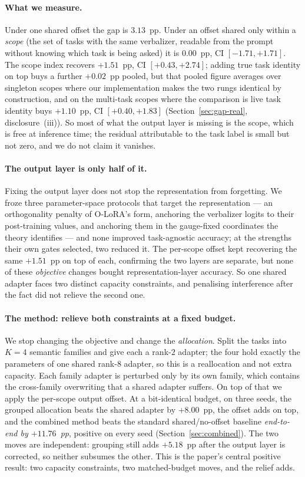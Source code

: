\paragraph{What we measure.}
Under one shared offset the gap is $3.13$~pp. Under an offset shared only within a
\emph{scope} (the set of tasks with the same verbalizer, readable from the prompt
without knowing which task is being asked) it is $0.00$~pp, CI $[-1.71,+1.71]$.
The scope index recovers $+1.51$~pp, CI $[+0.43,+2.74]$; adding true task identity
on top buys a further $+0.02$~pp pooled, but that pooled figure averages over
singleton scopes where our implementation makes the two rungs identical by
construction, and on the multi-task scopes where the comparison is live task
identity buys $+1.10$~pp, CI $[+0.40,+1.83]$
(Section~\ref{sec:gap-real}, disclosure~(iii)). So most of what the output layer is
missing is the scope, which is free at inference time; the residual attributable to
the task label is small but not zero, and we do not claim it vanishes.

\paragraph{The output layer is only half of it.}
Fixing the output layer does not stop the representation from forgetting. We froze
three parameter-space protocols that target the representation --- an orthogonality
penalty of O-LoRA's form, anchoring the verbalizer logits to their post-training
values, and anchoring them in the gauge-fixed coordinates the theory identifies ---
and none improved task-agnostic accuracy; at the strengths their own gates selected,
two reduced it. The per-scope offset kept recovering the same $+1.51$~pp on top of
each, confirming the two layers are separate, but none of these \emph{objective}
changes bought representation-layer accuracy. So one shared adapter faces two
distinct capacity constraints, and penalising interference after the fact did not
relieve the second one.

\paragraph{The method: relieve both constraints at a fixed budget.}
We stop changing the objective and change the \emph{allocation}. Split the tasks
into $K{=}4$ semantic families and give each a rank-$2$ adapter; the four hold
exactly the parameters of one shared rank-$8$ adapter, so this is a reallocation and
not extra capacity. Each family adapter is perturbed only by its own family, which
contains the cross-family overwriting that a shared adapter suffers. On top of that
we apply the per-scope output offset. At a bit-identical budget, on three seeds, the
grouped allocation beats the shared adapter by $+8.00$~pp, the offset adds on top,
and the combined method beats the standard shared/no-offset baseline
\emph{end-to-end by $+11.76$~pp}, positive on every seed (Section~\ref{sec:combined}).
The two moves are independent: grouping still adds $+5.18$~pp after the output layer
is corrected, so neither subsumes the other. This is the paper's central positive
result: two capacity constraints, two matched-budget moves, and the relief adds.

